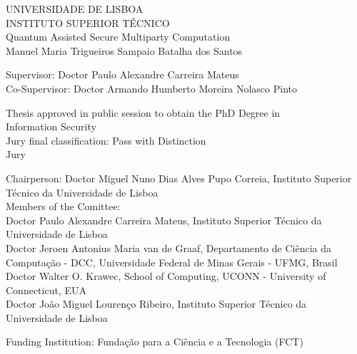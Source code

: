 \begin{center}
\vspace{0.5cm}
{\FontLb UNIVERSIDADE DE LISBOA} \\
\vspace{0.2cm}
{\FontLb INSTITUTO SUPERIOR T\'{E}CNICO} \\
\vspace{1cm}
{\FontHb 
Quantum Assisted Secure Multiparty Computation} \\

\vspace{1cm}
{\FontLn Manuel Maria Trigueiros Sampaio Batalha dos Santos} \\
\vspace{1cm}

\end{center}
\begin{flushleft}
{\FontMb Supervisor: \FontMn \qquad Doctor Paulo Alexandre Carreira Mateus} \\
{\FontMb Co-Supervisor: \FontMn \hspace{.0em} Doctor Armando Humberto Moreira Nolasco Pinto} \\

\vspace{0.7cm}
\end{flushleft}
\begin{center}
{\FontMn Thesis approved in public session to obtain the PhD Degree in\\ Information Security} \\
\vspace{0.5cm}
{\FontMb Jury final classification:} Pass with Distinction \\
\vspace{0.5cm}
{\FontMb Jury}\\
\end{center}
\vspace{0.5cm}
\begin{flushleft}
{\FontMb Chairperson:} Doctor Miguel Nuno Dias Alves Pupo Correia, Instituto Superior T\'ecnico da Universidade de Lisboa  \\
{\FontMb Members of the Comittee:}\\
Doctor Paulo Alexandre Carreira Mateus, Instituto Superior T\'ecnico da Universidade de Lisboa  \\
Doctor Jeroen Antonius Maria van de Graaf, Departamento de Ci\^encia da Computa\c c\~ao - DCC, Universidade Federal de Minas Gerais - UFMG, Brasil \\
Doctor Walter O. Krawec, School of Computing, UCONN - University of Connecticut, EUA \\
Doctor Jo\~ao Miguel Louren\c co Ribeiro, Instituto Superior T\'ecnico da Universidade de Lisboa
\vspace{1cm}

{\FontMb Funding Institution:} Funda\c c\~ao para a Ci\^encia e a Tecnologia (FCT)\end{flushleft}
\vfill \begin{center} {}
\end{center}
%